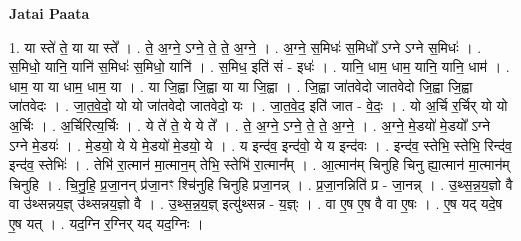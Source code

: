 \documentclass[17pt]{extarticle}
\begin{document}
\textbf{Jatai Paata} \newline

1. या स्ते॑ ते॒ या या स्ते᳚ । . ते॒ अ॒ग्ने॒ ऽग्ने॒ ते॒ ते॒ अ॒ग्ने॒ । . अ॒ग्ने॒ स॒मिधः॑ स॒मिधो᳚ ऽग्ने ऽग्ने स॒मिधः॑ । . स॒मिधो॒ यानि॒ यानि॑ स॒मिधः॑ स॒मिधो॒ यानि॑ । . स॒मिध॒ इति॑ सं - इधः॑ । . यानि॒ धाम॒ धाम॒ यानि॒ यानि॒ धाम॑ । . धाम॒ या या धाम॒ धाम॒ या । . या जि॒ह्वा जि॒ह्वा या या जि॒ह्वा । . जि॒ह्वा जा॑तवेदो जातवेदो जि॒ह्वा जि॒ह्वा जा॑तवेदः । . जा॒त॒वे॒दो॒ यो यो जा॑तवेदो जातवेदो॒ यः । . जा॒त॒वे॒द॒ इति॑ जात - वे॒दः॒ । . यो अ॒र्चि र॒र्चिर् यो यो अ॒र्चिः । . अ॒र्चिरित्य॒र्चिः । . ये ते॑ ते॒ ये ये ते᳚ । . ते॒ अ॒ग्ने॒ ऽग्ने॒ ते॒ ते॒ अ॒ग्ने॒ । . अ॒ग्ने॒ मे॒डयो॑ मे॒डयो᳚ ऽग्ने ऽग्ने मे॒डयः॑ । . मे॒डयो॒ ये ये मे॒डयो॑ मे॒डयो॒ ये । . य इन्द॑व॒ इन्द॑वो॒ ये य इन्द॑वः । . इन्द॑व॒ स्तेभि॒ स्तेभि॒ रिन्द॑व॒ इन्द॑व॒ स्तेभिः॑ । . तेभि॑ रा॒त्मान॑ मा॒त्मान॒म् तेभि॒ स्तेभि॑ रा॒त्मान᳚म् । . आ॒त्मान॑म् चिनुहि चिनु ह्या॒त्मान॑ मा॒त्मान॑म् चिनुहि । . चि॒नु॒हि॒ प्र॒जा॒नन् प्र॑जा॒नꣳ श्चि॑नुहि चिनुहि प्रजा॒नन्न् । . प्र॒जा॒नन्निति॑ प्र - जा॒नन्न् । . उ॒थ्स॒न्न॒य॒ज्ञो वै वा उ॑थ्सन्नय॒ज्ञ् उ॑थ्सन्नय॒ज्ञो वै । . उ॒थ्स॒न्न॒य॒ज्ञ् इत्यु॑थ्सन्न - य॒ज्ञ्ः । . वा ए॒ष ए॒ष वै वा ए॒षः । . ए॒ष यद् यदे॒ष ए॒ष यत् । . यद॒ग्नि र॒ग्निर् यद् यद॒ग्निः । \newline
\end{document}
